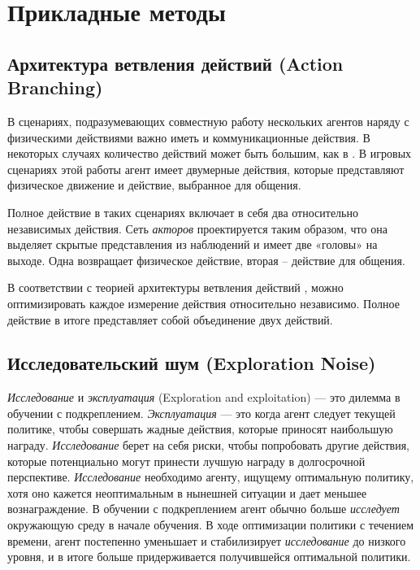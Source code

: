 \section{Прикладные методы}

\subsection{Архитектура ветвления действий (Action Branching)}

В сценариях, подразумевающих совместную работу нескольких агентов наряду с физическими действиями важно иметь и коммуникационные действия. В некоторых случаях количество действий может быть большим, как в \cite{tavakoli2017action}. В игровых сценариях этой работы агент имеет двумерные действия, которые представляют физическое движение и действие, выбранное для общения.

Полное действие в таких сценариях включает в себя два относительно независимых действия. Сеть \textit{акторов} проектируется таким образом, что она выделяет скрытые представления из наблюдений и имеет две «головы» на выходе. Одна возвращает физическое действие, вторая – действие для общения.

В соответствии с теорией архитектуры ветвления действий \cite{tavakoli2017action}, можно оптимизировать каждое измерение действия относительно независимо. Полное действие в итоге представляет собой объединение двух действий.

\subsection{Исследовательский шум (Exploration Noise)} %

\textit{Исследование} и \textit{эксплуатация} (Exploration and exploitation) — это дилемма в обучении с подкреплением. \textit{Эксплуатация} — это когда агент следует текущей политике, чтобы совершать жадные действия, которые приносят наибольшую награду. \textit{Исследование} берет на себя риски, чтобы попробовать другие действия, которые потенциально могут принести лучшую награду в долгосрочной перспективе. \textit{Исследование} необходимо агенту, ищущему оптимальную политику, хотя оно кажется неоптимальным в нынешней ситуации и дает меньшее вознаграждение. В обучении с подкреплением агент обычно больше \textit{исследует} окружающую среду в начале обучения. В ходе оптимизации политики с течением времени, агент постепенно уменьшает и стабилизирует \textit{исследование} до низкого уровня, и в итоге больше придерживается получившейся оптимальной политики.

